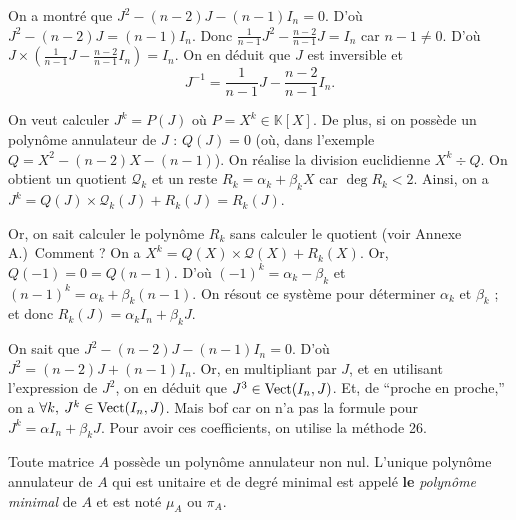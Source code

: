 \begin{exo}
	On a montré que $J^2 - (n-2) J - (n-1) I_n = 0$.
	D'où $J^2 - (n-2)J  = (n-1)I_n$. Donc $\frac{1}{n-1} J^2 - \frac{n-2}{n-1} J = I_n$\/ car $n-1 \neq 0$.
	D'où $J \times \left( \frac{1}{n-1} J - \frac{n-2}{n-1} I_n \right) = I_n$. On en déduit que $J$\/ est inversible et \[
		J^{-1} = \frac{1}{n-1} J - \frac{n-2}{n-1} I_n
	.\]
\end{exo}

\begin{met}
	On veut calculer $J^k = P(J)$\/ où $P = X^k \in \mathds{K}[X]$. De plus, si on possède un polynôme annulateur de $J$\/ : $Q(J) = 0$\/ (où, dans l'exemple $Q = X^2 - (n-2) X - (n-1)$).
	On réalise la division euclidienne $X^k\div Q$. On obtient un quotient $\mathcal{Q}_k$\/ et un reste $R_k = \alpha_k + \beta_k X$\/ car $\deg R_k < 2$.
	Ainsi, on a $J^k = Q(J) \times \mathcal{Q}_k(J) + R_k(J) = R_k(J)$.

	Or, on sait calculer le polynôme $R_k$\/ sans calculer le quotient (voir Annexe A.)\ Comment ? On a $X^k = Q(X) \times \mathcal{Q}(X) + R_k(X)$. Or, $Q(-1) = 0 = Q(n-1)$. D'où $(-1)^k = \alpha_k - \beta_k$\/ et $(n-1)^k = \alpha_k + \beta_k (n-1)$. On résout ce système pour déterminer $\alpha_k$\/ et $\beta_k$\/ ; et donc $R_k(J) = \alpha_k I_n + \beta_k J$.
\end{met}

\begin{exo}
	On sait que $J^2 - (n-2) J - (n-1) I_n = 0$. D'où $J^2 = (n-2) J + (n-1) I_n$. Or, en multipliant par $J$, et en utilisant l'expression de $J^2$, on en déduit que $J^3 \in \operatorname{Vect}(I_n, J)$. Et, de ``proche en proche,'' on a $\forall k,\:J^k \in \operatorname{Vect}(I_n, J)$.
	Mais {\sc bof}\/ car on n'a pas la formule pour $J^k = \alpha I_n + \beta_k J$.
	Pour avoir ces coefficients, on utilise la {\sc méthode 26}.
\end{exo}

\begin{prop-defn}
	Toute matrice $A$\/ possède un polynôme annulateur non nul.
	L'unique polynôme annulateur de $A$\/ qui est unitaire et de degré minimal est appelé {\bf le} {\it polynôme minimal}\/ de $A$\/ et est noté $\mu_A$ ou $\pi_A$.
\end{prop-defn}

